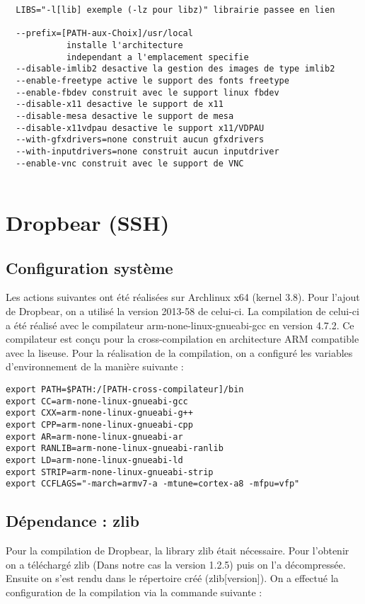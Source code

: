 \begin{lstlisting}
  LIBS="-l[lib] exemple (-lz pour libz)" librairie passee en lien
  
  --prefix=[PATH-aux-Choix]/usr/local
            installe l'architecture
            independant a l'emplacement specifie
  --disable-imlib2 desactive la gestion des images de type imlib2
  --enable-freetype active le support des fonts freetype 
  --enable-fbdev construit avec le support linux fbdev
  --disable-x11 desactive le support de x11
  --disable-mesa desactive le support de mesa
  --disable-x11vdpau desactive le support x11/VDPAU
  --with-gfxdrivers=none construit aucun gfxdrivers
  --with-inputdrivers=none construit aucun inputdriver
  --enable-vnc construit avec le support de VNC
  
\end{lstlisting}

\newpage   	
	
\section{Dropbear (SSH)}	

\subsection{Configuration système}

Les actions suivantes ont été réalisées sur Archlinux x64 (kernel 3.8).
Pour l'ajout de Dropbear, on a utilisé la version 2013-58 de celui-ci. La compilation de celui-ci a été réalisé avec le compilateur arm-none-linux-gnueabi-gcc en version 4.7.2. Ce compilateur est conçu pour la cross-compilation en architecture ARM compatible avec la liseuse. 
Pour la réalisation de la compilation, on a configuré les variables d'environnement de la manière suivante : 

\begin{lstlisting}
export PATH=$PATH:/[PATH-cross-compilateur]/bin
export CC=arm-none-linux-gnueabi-gcc
export CXX=arm-none-linux-gnueabi-g++
export CPP=arm-none-linux-gnueabi-cpp
export AR=arm-none-linux-gnueabi-ar
export RANLIB=arm-none-linux-gnueabi-ranlib
export LD=arm-none-linux-gnueabi-ld
export STRIP=arm-none-linux-gnueabi-strip
export CCFLAGS="-march=armv7-a -mtune=cortex-a8 -mfpu=vfp"
\end{lstlisting}

\subsection{Dépendance : zlib}
Pour la compilation de Dropbear, la library zlib était nécessaire.
Pour l'obtenir on a téléchargé zlib (Dans notre cas la version 1.2.5) puis on  l'a décompressée. Ensuite on s'est rendu dans le répertoire créé (zlib[version]). On a effectué la configuration de la compilation via la commande suivante :

